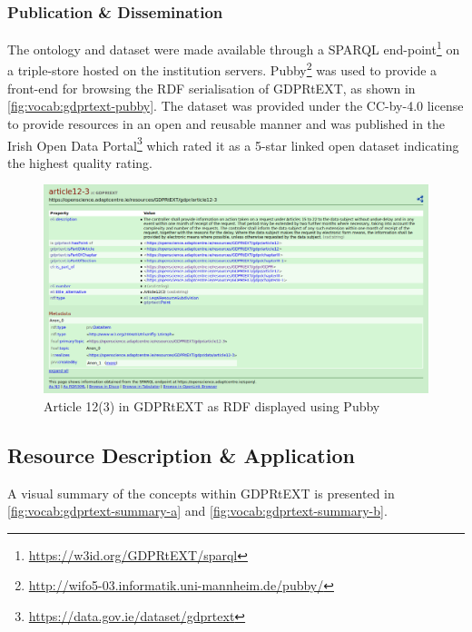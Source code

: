 \subsubsection{Publication \& Dissemination}
The ontology and dataset were made available through a SPARQL end-point\footnote{\url{https://w3id.org/GDPRtEXT/sparql}} on a triple-store hosted on the institution servers. Pubby\footnote{\url{http://wifo5-03.informatik.uni-mannheim.de/pubby/}} was used to provide a front-end for browsing the RDF serialisation of GDPRtEXT, as shown in \autoref{fig:vocab:gdprtext-pubby}. The dataset was provided under the CC-by-4.0 license to provide resources in an open and reusable manner and was published in the Irish Open Data Portal\footnote{\url{https://data.gov.ie/dataset/gdprtext}} which rated it as a 5-star linked open dataset indicating the highest quality rating. \begin{figure}[htbp]
    \centering
    \includegraphics[width=\linewidth]{img/gdprtext-pubby}
    \caption{Article 12(3) in GDPRtEXT as RDF displayed using Pubby \cite{pandit_gdprtext_2018}}
    \label{fig:vocab:gdprtext-pubby}
\end{figure}

\subsection{Resource Description \& Application}
A visual summary of the concepts within GDPRtEXT is presented in \autoref{fig:vocab:gdprtext-summary-a} and \autoref{fig:vocab:gdprtext-summary-b}.

